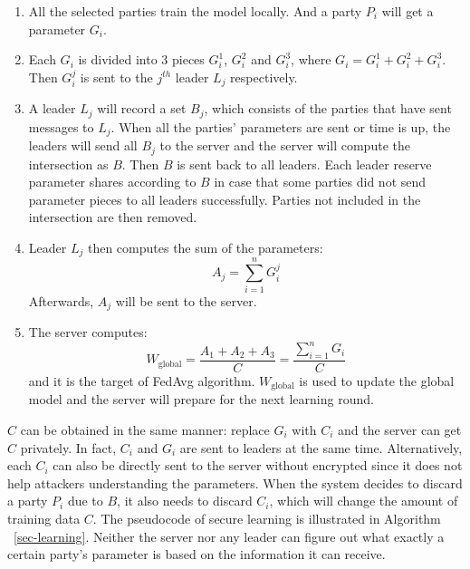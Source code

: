 \begin{enumerate}
    \item All the selected parties train the model locally. And a party $P_i$ will get a parameter $G_i$.
    
    \item Each $G_i$ is divided into 3 pieces $G_i^1$, $G_i^2$ and $G_i^3$, where $G_i = G_i^1 + G_i^2 + G_i^3$. Then $G_i^j$ is sent to the $j^{th}$ leader $L_j$ respectively.
    
    \item A leader $L_j$ will record a set $B_j$, which consists of the parties that have sent messages to $L_j$. When all the parties' parameters are sent or time is up, the leaders will send all $B_j$ to the server and the server will compute the intersection as $B$. Then $B$ is sent back to all leaders. Each leader reserve parameter shares according to $B$ in case that some parties did not send parameter pieces to all leaders successfully. Parties not included in the intersection are then removed. 

    \item Leader $L_j$ then computes the sum of the parameters:
    $$A_j = \sum_{i=1}^nG_i^j$$ 
    Afterwards, $A_j$ will be sent to the server.

    \item The server computes: 
    $$W_\textrm{global} = \frac{A_1 + A_2 + A_3}{C}  = \frac{\sum_{i=1}^nG_i}{C} $$ 
    and it is the target of FedAvg algorithm. $W_\textrm{global}$ is used to update the global model and the server will prepare for the next learning round.
\end{enumerate}

$C$ can be obtained in the same manner: replace $G_i$ with $C_i$ and the server can get $C$ privately. In fact, $C_i$ and $G_i$ are sent to leaders at the same time. Alternatively, each $C_i$ can also be directly sent to the server without encrypted since it does not help attackers understanding the parameters. When the system decides to discard a party $P_i$ due to $B$, it also needs to discard $C_i$, which will change the amount of training data $C$. The pseudocode of secure learning is illustrated in Algorithm ~\ref{sec-learning}. Neither the server nor any leader can figure out what exactly a certain party's parameter is based on the information it can receive. 

